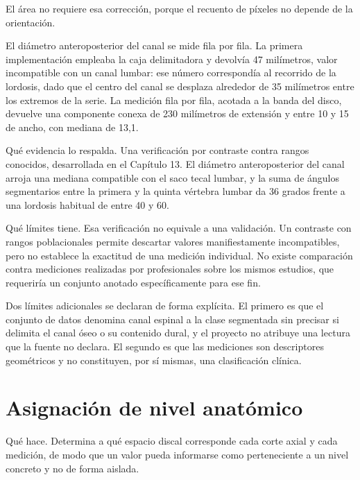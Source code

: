 El área no requiere esa corrección, porque el recuento de píxeles no depende de la orientación.

El diámetro anteroposterior del canal se mide fila por fila. La primera implementación empleaba la caja delimitadora y devolvía 47 milímetros, valor incompatible con un canal lumbar: ese número correspondía al recorrido de la lordosis, dado que el centro del canal se desplaza alrededor de 35 milímetros entre los extremos de la serie. La medición fila por fila, acotada a la banda del disco, devuelve una componente conexa de 230 milímetros de extensión y entre 10 y 15 de ancho, con mediana de 13,1.


Qué evidencia lo respalda. Una verificación por contraste contra rangos conocidos, desarrollada en el Capítulo 13. El diámetro anteroposterior del canal arroja una mediana compatible con el saco tecal lumbar, y la suma de ángulos segmentarios entre la primera y la quinta vértebra lumbar da 36 grados frente a una lordosis habitual de entre 40 y 60.

Qué límites tiene. Esa verificación no equivale a una validación. Un contraste con rangos poblacionales permite descartar valores manifiestamente incompatibles, pero no establece la exactitud de una medición individual. No existe comparación contra mediciones realizadas por profesionales sobre los mismos estudios, que requeriría un conjunto anotado específicamente para ese fin.

Dos límites adicionales se declaran de forma explícita. El primero es que el conjunto de datos denomina canal espinal a la clase segmentada sin precisar si delimita el canal óseo o su contenido dural, y el proyecto no atribuye una lectura que la fuente no declara. El segundo es que las mediciones son descriptores geométricos y no constituyen, por sí mismas, una clasificación clínica.

\section{Asignación de nivel anatómico}

Qué hace. Determina a qué espacio discal corresponde cada corte axial y cada medición, de modo que un valor pueda informarse como perteneciente a un nivel concreto y no de forma aislada.

